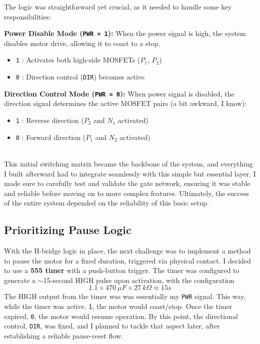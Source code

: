 \documentclass{article}
\newcommand{\code}[1]{\colorbox{light-gray}{\texttt{#1}}}
\begin{document}
The logic was straightforward yet crucial, as it needed to handle some key responsibilities:\\[5pt]
\hspace*{-1em}
\begin{minipage}{0.53\textwidth}
	\textbf{Power Disable Mode (\texttt{PWR = 1}):} 
	When the power signal is high, the system disables motor drive, allowing it to coast to a stop.
	\begin{itemize}[itemsep=-1mm]
		\item \code{1} : Activates both high-side MOSFETs ($P_1$, $P_2$)
		\item \code{0} : Direction control (\texttt{DIR}) becomes active
	\end{itemize}	
\end{minipage}\hspace{1em}
\begin{minipage}{0.5\textwidth}
	\textbf{Direction Control Mode (\texttt{PWR = 0}):} 
	When power signal is disabled, the direction signal determines the active MOSFET pairs (a bit awkward, I know):
	\begin{itemize}[itemsep=-1mm]
		\item \code{1} : Reverse direction ($P_2$ and $N_1$ activated)
		\item \code{0} : Forward direction ($P_1$ and $N_2$ activated)
	\end{itemize}
\end{minipage}\\[8pt]
This initial switching matrix became the backbone of the system, and everything I built afterward had to integrate seamlessly with this simple but essential layer. I made sure to carefully test and validate the gate network, ensuring it was stable and reliable before moving on to more complex features. Ultimately, the success of the entire system depended on the reliability of this basic setup.
\vspace{-0.4em}
\subsection{Prioritizing Pause Logic}
With the H-bridge logic in place, the next challenge was to implement a method to {pause the motor} for a fixed duration, triggered via physical contact. I decided to use a \textbf{555 timer} with a push-button trigger. The timer was configured to generate a $\sim$15-second HIGH pulse upon activation, with the configuration $$1.1 \times 470\ \mu{F} \times 27\ {k}\Omega\approx 15s$$
The HIGH output from the timer was was essentially my \texttt{PWR} signal. This way, while the timer was active, \texttt{1}, the motor would {coast/stop}. Once the timer expired, \texttt{0}, the motor would resume operation. By this point, the directional control, \texttt{DIR}, was fixed, and I planned to tackle that aspect later, after establishing a reliable pause-reset flow.
\end{document}
